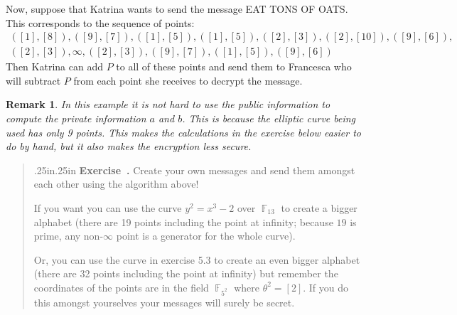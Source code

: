 \documentclass[12 pt]{article}
\newtheorem{remark}{Remark}
\DeclareMathOperator{\F}{\mathbb{F}}
\newcounter{exercise}[section]
\newenvironment{exercise}{\refstepcounter{exercise}\par\bigskip \begin{quotation}{}{\leftmargin .25in\rightmargin .25in}
	\noindent \textbf{Exercise~\thesection.\theexercise }  \rmfamily}{\end{quotation}\par\bigskip}
\begin{document}
Now, suppose that Katrina wants to send the message EAT TONS OF OATS. This corresponds to the sequence of points:
\begin{align*}
([1],[8]),([9],[7]),([1],[5]),([1],[5]),([2],[3]),([2],[10]),([9],[6]),\\ ([2],[3]),\infty,([2],[3]),([9],[7]),([1],[5]),([9],[6])
\end{align*}
Then Katrina can add $P$ to all of these points and send them to Francesca who will subtract $P$ from each point she receives to decrypt the message.

\begin{remark}
	In this example it is not hard to use the public information to compute the private information $a$ and $b$. This is because the elliptic curve being used has only 9 points. This makes the calculations in the exercise below easier to do by hand, but it also makes the encryption less secure.
\end{remark}

\begin{exercise}
Create your own messages and send them amongst each other using the algorithm above! 

If you want you can use the curve $y^2 = x^3 - 2$ over $\F_{13}$ to create a bigger alphabet (there are 19 points including the point at infinity; because $19$ is prime, any non-$\infty$ point is a generator for the whole curve). 



Or, you can use the curve in exercise 5.3 to create an even bigger alphabet (there are 32 points including the point at infinity) but remember the coordinates of the points are in the field $\F_{5^2}$ where $\theta^2=[2]$. If you do this amongst yourselves your messages will surely be secret.
\end{exercise}
\end{document}
